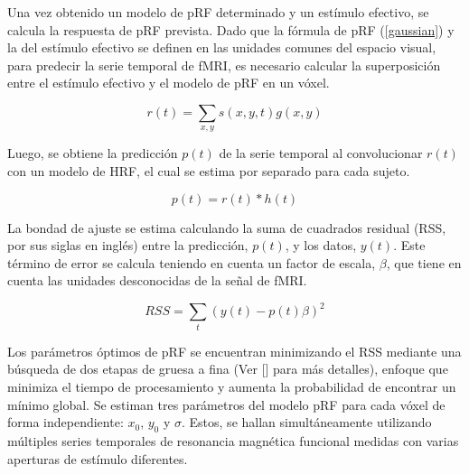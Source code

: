 Una vez obtenido un modelo de pRF determinado y un estímulo efectivo, se calcula la respuesta de pRF prevista. Dado que la fórmula de pRF (\ref{gaussian}) y la del estímulo efectivo se definen en las unidades comunes del espacio visual, para predecir la serie temporal de fMRI, es necesario calcular la superposición entre el estímulo efectivo y el modelo de pRF en un vóxel.

\begin{equation}
	r(t)=\sum_{x,y}s(x,y,t)g(x,y)
\end{equation}

Luego, se obtiene la predicción $p(t)$ de la serie temporal al convolucionar $r(t)$ con un modelo de HRF, el cual se estima por separado para cada sujeto.

\begin{equation}
	p(t) = r(t) * h(t)
\end{equation}

La bondad de ajuste se estima calculando la suma de cuadrados residual (RSS, por sus siglas en ingl\'es) entre la predicción, $p(t)$, y los datos, $y(t)$. Este término de error se calcula teniendo en cuenta un factor de escala, $\beta$, que tiene en cuenta las unidades desconocidas de la señal de fMRI.

\begin{equation}
	RSS = \sum_{t}(y(t)-p(t)\beta)^2
\end{equation}

Los parámetros óptimos de pRF se encuentran minimizando el RSS mediante una búsqueda de dos etapas de gruesa a fina (Ver [\cite{dumoulin_population_2008}] para m\'as detalles), enfoque que minimiza el tiempo de procesamiento y aumenta la probabilidad de encontrar un mínimo global. Se estiman tres parámetros del modelo pRF para cada vóxel de forma independiente: $x_0$, $y_0$ y $\sigma$. Estos, se hallan simultáneamente utilizando múltiples series temporales de resonancia magnética funcional medidas con varias aperturas de estímulo diferentes.

